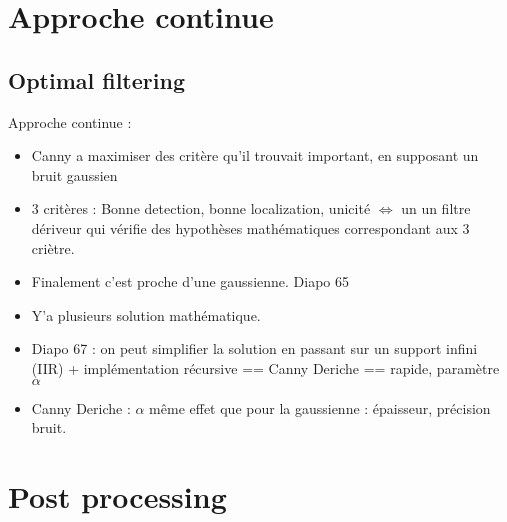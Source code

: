 \documentclass{article}
\theoremstyle{plain}%
\theoremstyle{definition}
\theoremstyle{remark}
\begin{document}
\section{Approche continue}
\subsection{Optimal filtering}
Approche continue :
\begin{itemize}
    \item Canny a maximiser des critère qu'il trouvait important, en supposant un bruit gaussien
    \item 3 critères : Bonne detection, bonne localization, unicité $ \Leftrightarrow $ un un filtre dériveur qui vérifie des hypothèses mathématiques correspondant aux 3 criètre.
    \item Finalement c'est proche d'une gaussienne. Diapo 65
    \item Y'a plusieurs solution mathématique.
    \item Diapo 67 : on peut simplifier la solution en passant sur un support infini (IIR) + implémentation récursive == Canny Deriche == rapide, paramètre $ \alpha  $ 
    \item Canny Deriche : $ \alpha  $ même effet que pour la gaussienne : épaisseur, précision bruit. 
\end{itemize}

\section{Post processing}
\end{document}
